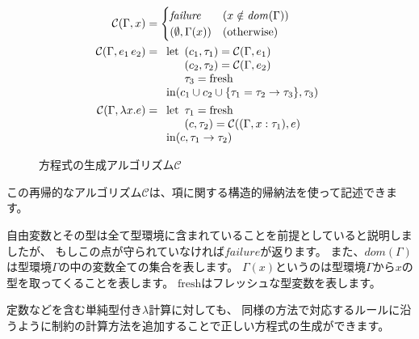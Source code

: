 \begin{figure}[htbp]
  \begin{align*}
    \mathcal{C}(\Gamma, x) &=
    \begin{cases}
      \mathit{failure}       & (x \notin \mathit{dom}(\Gamma)) \\
      (\emptyset, \Gamma(x)) & (\text{otherwise}) \\
    \end{cases} \\
    \mathcal{C}(\Gamma, e_1 \, e_2) &=
    \begin{array}[t]{l}
      \mathrm{let}
        \begin{array}[t]{l}
          (c_1, \tau_1) = \mathcal{C}(\Gamma, e_1) \\
          (c_2, \tau_2) = \mathcal{C}(\Gamma, e_2) \\
          \tau_3 = \mathrm{fresh}
        \end{array} \\
      \mathrm{in} (c_1 \cup c_2 \cup \{\tau_1 = \tau_2 \to \tau_3\}, \tau_3)
    \end{array} \\
    \mathcal{C}(\Gamma, \lambda x . e) &=
    \begin{array}[t]{l}
      \mathrm{let}
        \begin{array}[t]{l}
          \tau_1 = \mathrm{fresh} \\
          (c, \tau_2) = \mathcal{C}((\Gamma, x : \tau_1), e)
        \end{array} \\
      \mathrm{in} (c, \tau_1 \to \tau_2)
    \end{array}
  \end{align*}
  \caption{方程式の生成アルゴリズム$\mathcal C$}
  \label{fig:algorithm-c}
\end{figure}

この再帰的なアルゴリズム$\mathcal C$は、項に関する構造的帰納法を使って記述できます。

自由変数とその型は全て型環境に含まれていることを前提としていると説明しましたが、
もしこの点が守られていなければ$\mathit{failure}$が返ります。
また、$\mathit{dom}(\Gamma)$は型環境$\Gamma$の中の変数全ての集合を表します。
$\Gamma(x)$というのは型環境$\Gamma$から$x$の型を取ってくることを表します。
$\mathrm{fresh}$はフレッシュな型変数を表します。

定数などを含む単純型付き$\lambda$計算に対しても、
同様の方法で対応するルールに沿うように制約の計算方法を追加することで正しい方程式の生成ができます。


